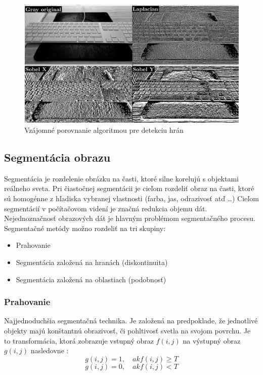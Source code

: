 \begin{figure}[H]
\begin{center}
	\includegraphics[scale=0.16]{images/edgeDetector}
	\caption{Vzájomné porovnanie algoritmou pre detekciu hrán}
	\end{center}
\end{figure}


\subsection{Segmentácia obrazu}
Segmentácia je rozdelenie obrázku na časti, ktoré silne korelujú s objektami reálneho sveta. Pri čiastočnej segmentácii je cieľom rozdeliť obraz na časti, ktoré sú homogénne z hľadiska vybranej vlastnosti (farba, jas, odrazivosť atď …) Cieľom segmentácií v počítačovom videní je značná redukcia objemu dát. Nejednoznačnosť obrazových dát je hlavným problémom segmentačného procesu. \cite{pocitacove_videnie_v_praxi} Segmentačné metódy možno rozdeliť na tri skupiny: 


\begin{itemize}
\item Prahovanie
\item Segmentácia založená na hranách (diskontinuita)
\item Segmentácia založená na oblastiach (podobnosť)
\end{itemize}

\subsubsection{Prahovanie}
Najjednoduchšia segmentačná technika. Je založená na predpoklade, že jednotlivé objekty majú konštantnú obrazivosť, či pohltivosť svetla na svojom povrchu. Je to transformácia, ktorá zobrazuje vstupný obraz $f(i, j)$ na výstupný obraz $g(i, j)$ nasledovne \cite{fit_trasholding} : 
$$g (i{,}j)=1 {,}\quad {ak} f(i{,}j)\ge T$$
$$g (i{,}j)=0 {,}\quad {ak} f(i{,}j)  < T$$


